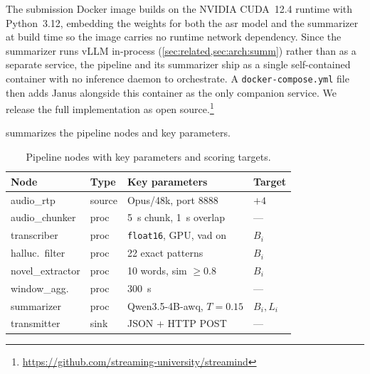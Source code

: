 \documentclass[conference,letterpaper]{IEEEtran}
\begin{document}
The submission Docker image builds on the NVIDIA CUDA~\num{12.4} runtime with Python~\num{3.12}, embedding the weights for both the \gls{asr} model and the summarizer at build time so the image carries no runtime network dependency.
Since the summarizer runs vLLM in-process (\cref{sec:related,sec:arch:summ}) rather than as a separate service, the pipeline and its summarizer ship as a single self-contained container with no inference daemon to orchestrate.
A \texttt{docker-compose.yml} file then adds Janus alongside this container as the only companion service.
We release the full implementation as open source.\footnote{\url{https://github.com/streaming-university/streamind}}

 summarizes the pipeline nodes and key parameters.

\begin{table}[htb!]
    \centering
    \vspace{-2mm}
    \caption{Pipeline nodes with key parameters and scoring targets.}
    \label{tab:nodes}
    \setlength{\tabcolsep}{3pt}
    \small
    \begin{tabularx}{0.98\columnwidth}{@{}l l X l@{}}
        \toprule
        \textbf{Node}    & \textbf{Type} & \textbf{Key parameters}                        & \textbf{Target} \\
        \midrule
        audio\_rtp       & source        & Opus/48k, port 8888                            & $+4$            \\
        audio\_chunker   & proc          & \SI{5}{\second} chunk, \SI{1}{\second} overlap & ---             \\
        transcriber      & proc          & \texttt{float16}, GPU, \gls{vad} on            & $B_i$           \\
        halluc.\ filter  & proc          & 22 exact patterns                              & $B_i$           \\
        novel\_extractor & proc          & 10 words, sim $\ge 0.8$                        & $B_i$           \\
        window\_agg.     & proc          & \SI{300}{\second}                              & ---             \\
        summarizer       & proc          & Qwen3.5-4B-\gls{awq}, $T\!=\!0.15$             & $B_i, L_i$      \\
        transmitter      & sink          & JSON + HTTP POST                               & ---             \\
        \bottomrule
    \end{tabularx}
    \vspace{-2mm}
\end{table}
\end{document}

